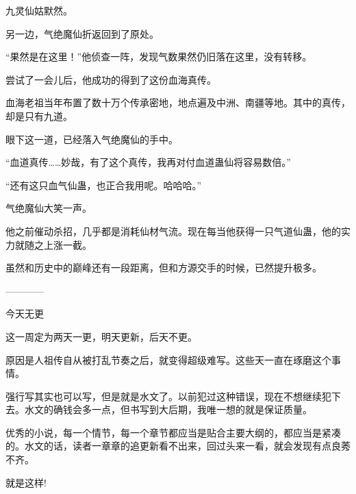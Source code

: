\begin{this_body}
九灵仙姑默然。

另一边，气绝魔仙折返回到了原处。

“果然是在这里！”他侦查一阵，发现气数果然仍旧落在这里，没有转移。

尝试了一会儿后，他成功的得到了这份血海真传。

血海老祖当年布置了数十万个传承密地，地点遍及中洲、南疆等地。其中的真传，却是只有九道。

眼下这一道，已经落入气绝魔仙的手中。

“血道真传……妙哉，有了这个真传，我再对付血道蛊仙将容易数倍。”

“还有这只血气仙蛊，也正合我用呢。哈哈哈。”

气绝魔仙大笑一声。

他之前催动杀招，几乎都是消耗仙材气流。现在每当他获得一只气道仙蛊，他的实力就随之上涨一截。

虽然和历史中的巅峰还有一段距离，但和方源交手的时候，已然提升极多。

------------

今天无更

这一周定为两天一更，明天更新，后天不更。

原因是人祖传自从被打乱节奏之后，就变得超级难写。这些天一直在琢磨这个事情。

强行写其实也可以写，但是就是水文了。以前犯过这种错误，现在不想继续犯下去。水文的确钱会多一点，但书写到大后期，我唯一想的就是保证质量。

优秀的小说，每一个情节，每一个章节都应当是贴合主要大纲的，都应当是紧凑的。水文的话，读者一章章的追更新看不出来，回过头来一看，就会发现有点良莠不齐。

就是这样!

\end{this_body}

